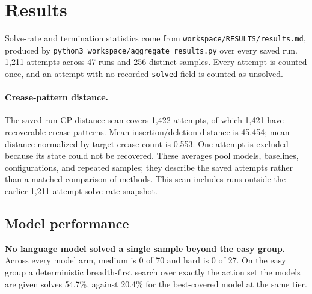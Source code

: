 \section{Results}
\label{sec:results}

Solve-rate and termination statistics come from \texttt{workspace/RESULTS/results.md}, produced by
\texttt{python3 workspace/aggregate\_results.py} over every saved run. 1,211%
attempts across 47 runs and 256 distinct samples. Every attempt is counted once, and an attempt with
no recorded \texttt{solved} field is counted as unsolved.

\paragraph{Crease-pattern distance.}
The saved-run CP-distance scan covers 1,422 attempts, of which 1,421 have recoverable
crease patterns. Mean insertion/deletion distance is 45.454; mean distance normalized
by target crease count is 0.553. One attempt is excluded because its state could not be
recovered. These averages pool models, baselines, configurations, and repeated samples;
they describe the saved attempts rather than a matched comparison of methods. This scan
includes runs outside the earlier 1,211-attempt solve-rate snapshot.

\subsection{Model performance}
\label{sec:results-headline}

\textbf{No language model solved a single sample beyond the easy group.} Across every model arm,
medium is 0 of 70 and hard is 0 of 27. On the easy group a deterministic breadth-first search over
exactly the action set the models are given solves 54.7\%, against 20.4\% for the best-covered model
at the same tier.

